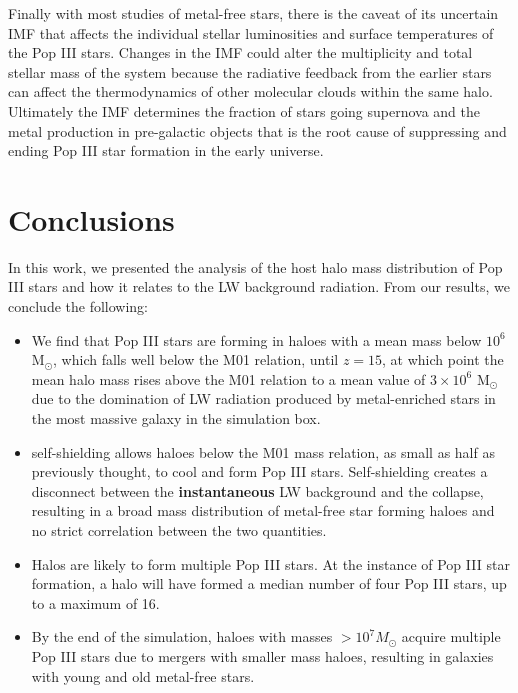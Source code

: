 \documentclass[fleqn,usenatbib]{mnras}
\begin{document}
Finally with most studies of metal-free stars, there is the caveat of its uncertain IMF that affects the individual stellar luminosities and surface temperatures of the Pop III stars.  Changes in the IMF could alter the multiplicity and total stellar mass of the system because the radiative feedback from the earlier stars can affect the thermodynamics of other molecular clouds within the same halo.  Ultimately the IMF determines the fraction of stars going supernova and the metal production in pre-galactic objects that is the root cause of suppressing and ending Pop III star formation in the early universe.

\section{Conclusions}
In this work, we presented the analysis of the host halo mass distribution of Pop III stars and how it relates to the LW background radiation. From our results, we conclude the following: 

\begin{itemize}
	\item We find that Pop III stars are forming in haloes with a mean mass below $10^{6}$ M$_{\odot}$, which falls well below the M01 relation, until $z=15$, at which point the mean halo mass rises above the M01 relation to a mean value of $3 \times 10^{6}$ M$_{\odot}$ due to the domination of LW radiation produced by metal-enriched stars in the most massive galaxy in the simulation box.
	\item \hh{} self-shielding allows haloes below the M01 mass relation, as small as half as previously thought, to cool and form Pop III stars.  Self-shielding creates a disconnect between the \textbf{instantaneous} LW background and the collapse, resulting in a broad mass distribution of metal-free star forming haloes and no strict correlation between the two quantities.
	\item Halos are likely to form multiple Pop III stars. At the instance of Pop III star formation, a halo will have formed a median number of four Pop III stars, up to a maximum of 16.
	\item By the end of the simulation, haloes with masses $>10^{7} M_{\odot}$ acquire multiple Pop III stars due to mergers with smaller mass haloes, resulting in galaxies with young and old metal-free stars. 
\end{itemize}
\end{document}
